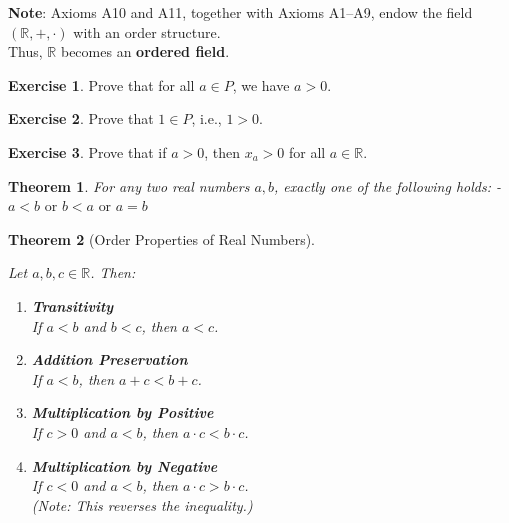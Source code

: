 \documentclass[
]{book}
\newtheorem{theorem}{Theorem}[chapter]
\theoremstyle{definition}
\theoremstyle{definition}
\theoremstyle{definition}
\newtheorem{exercise}{Exercise}[chapter]
\theoremstyle{definition}
\theoremstyle{remark}
\begin{document}
\textbf{Note}: Axioms A10 and A11, together with Axioms A1--A9, endow the field \((\mathbb{R}, +, \cdot)\) with an order structure.\\
Thus, \(\mathbb{R}\) becomes an \textbf{ordered field}.

\begin{exercise}
\protect\hypertarget{exr:unnamed-chunk-96}{}\label{exr:unnamed-chunk-96}Prove that for all \(a \in P\), we have \(a > 0\).
\end{exercise}

\begin{exercise}
\protect\hypertarget{exr:unnamed-chunk-97}{}\label{exr:unnamed-chunk-97}Prove that \(1 \in P\), i.e., \(1 > 0\).
\end{exercise}

\begin{exercise}
\protect\hypertarget{exr:unnamed-chunk-98}{}\label{exr:unnamed-chunk-98}Prove that if \(a > 0\), then \(x_a > 0\) for all \(a \in \mathbb{R}\).
\end{exercise}

\begin{theorem}
\protect\hypertarget{thm:unnamed-chunk-99}{}\label{thm:unnamed-chunk-99}For any two real numbers \(a, b\), exactly one of the following holds:
- \(a < b \text{ or } b < a \text{ or } a = b\)
\end{theorem}

\begin{theorem}[Order Properties of Real Numbers]
\protect\hypertarget{thm:unnamed-chunk-100}{}\label{thm:unnamed-chunk-100}

Let \(a, b, c \in \mathbb{R}\). Then:

\begin{enumerate}
\def\labelenumi{\arabic{enumi}.}
\item
  \textbf{Transitivity}\\
  If \(a < b\) and \(b < c\), then \(a < c\).
\item
  \textbf{Addition Preservation}\\
  If \(a < b\), then \(a + c < b + c\).
\item
  \textbf{Multiplication by Positive}\\
  If \(c > 0\) and \(a < b\), then \(a \cdot c < b \cdot c\).
\item
  \textbf{Multiplication by Negative}\\
  If \(c < 0\) and \(a < b\), then \(a \cdot c > b \cdot c\).\\
  \emph{(Note: This reverses the inequality.)}
\end{enumerate}

\end{theorem}
\end{document}
